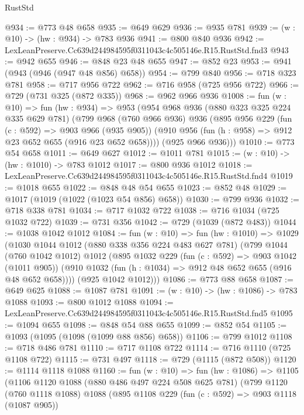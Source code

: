 \begin{lexlean}{RustStd}
\begin{coremodule}
@934 := @773 @48 @658
@935 := @649 @629
@936 := @935 @781
@939 := (w : @10) -> (hw : @934) -> @783 @936
@941 := @800 @840 @936
@942 := LexLeanPreserve.Cc639d244984595f0311043c4c505146e.R15.RustStd.fnd3
@943 := @942 @655
@946 := @848 @23 @48 @655
@947 := @852 @23
@953 := @941 (@943 (@946 (@947 @48 @856) @658))
@954 := @799 @840
@956 := @718 @323 @781
@958 := @717 @956 @722
@962 := @716 @958 (@725 @956 @722)
@966 := @729 (@731 @325 (@872 @335))
@968 := @962 @966 @936
@1008 := fun (w : @10) =>
  fun (hw : @934) =>
  @953
    (@954
      @968
      @936
      (@880 @323 @325 @224 @335 @629 @781)
      (@799
        @968
        (@760 @966 @936)
        @936
        (@895
          @956
          @229
          (fun (c : @592) => @903 @966 (@935 @905))
          (@910 @956 (fun (h : @958) => @912 @23 @652 @655 (@916 @23 @652 @658))))
        (@925 @966 @936)))
@1010 := @773 @54 @658
@1011 := @649 @627
@1012 := @1011 @781
@1015 := (w : @10) -> (hw : @1010) -> @783 @1012
@1017 := @800 @936 @1012
@1018 := LexLeanPreserve.Cc639d244984595f0311043c4c505146e.R15.RustStd.fnd4
@1019 := @1018 @655
@1022 := @848 @48 @54 @655
@1023 := @852 @48
@1029 := @1017 (@1019 (@1022 (@1023 @54 @856) @658))
@1030 := @799 @936
@1032 := @718 @338 @781
@1034 := @717 @1032 @722
@1038 := @716 @1034 (@725 @1032 @722)
@1039 := @731 @356
@1042 := @729 (@1039 (@872 @483))
@1044 := @1038 @1042 @1012
@1084 := fun (w : @10) =>
  fun (hw : @1010) =>
  @1029
    (@1030
      @1044
      @1012
      (@880 @338 @356 @224 @483 @627 @781)
      (@799
        @1044
        (@760 @1042 @1012)
        @1012
        (@895
          @1032
          @229
          (fun (c : @592) => @903 @1042 (@1011 @905))
          (@910 @1032 (fun (h : @1034) => @912 @48 @652 @655 (@916 @48 @652 @658))))
        (@925 @1042 @1012)))
@1086 := @773 @88 @658
@1087 := @649 @625
@1088 := @1087 @781
@1091 := (w : @10) -> (hw : @1086) -> @783 @1088
@1093 := @800 @1012 @1088
@1094 := LexLeanPreserve.Cc639d244984595f0311043c4c505146e.R15.RustStd.fnd5
@1095 := @1094 @655
@1098 := @848 @54 @88 @655
@1099 := @852 @54
@1105 := @1093 (@1095 (@1098 (@1099 @88 @856) @658))
@1106 := @799 @1012
@1108 := @718 @486 @781
@1110 := @717 @1108 @722
@1114 := @716 @1110 (@725 @1108 @722)
@1115 := @731 @497
@1118 := @729 (@1115 (@872 @508))
@1120 := @1114 @1118 @1088
@1160 := fun (w : @10) =>
  fun (hw : @1086) =>
  @1105
    (@1106
      @1120
      @1088
      (@880 @486 @497 @224 @508 @625 @781)
      (@799
        @1120
        (@760 @1118 @1088)
        @1088
        (@895
          @1108
          @229
          (fun (c : @592) => @903 @1118 (@1087 @905))

\end{coremodule}
\end{lexlean}
